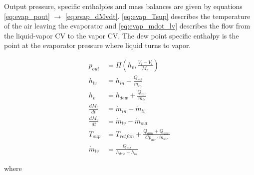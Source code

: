 \medskip
Output pressure, specific enthalpies and mass balances are given by equations \cref{eq:evap_pout} $\rightarrow$ \cref{eq:evap_dMvdt}. \cref{eq:evap_Tsup} describes the temperature of the air leaving the evaporator and \cref{eq:evap_mdot_lv} describes the flow from the liquid-vapor CV to the vapor CV. The dew point specific enthalpy is the point at the evaporator pressure where liquid turns to vapor.

\begin{align}
	p_{out}         & = \Pi \left( h_v, \frac{V_i-V_l}{M_v} \right)		\label{eq:evap_pout}                       \\
	h_{lv}             & = h_{in} + \frac{Q_{ml}}{\dot{m}_{in}}                                                       \\
	h_v             & = h_{dew} + \frac{Q_{mv}}{\dot{m}_{lv}}                                                       \\
	\frac{dM_l}{dt} & = \dot{m}_{in} - \dot{m}_{lv}                                                                \\
	\frac{dM_v}{dt} & = \dot{m}_{lv} - \dot{m}_{out}                   \label{eq:evap_dMvdt}                       \\
	T_{sup}         & = T_{retfan} +  \frac{Q_{aml} + Q_{amv}}{Cp_{air} \cdot \dot{m}_{air}} \label{eq:evap_Tsup} \\
	\dot{m}_{lv}    & = \frac{Q_{ml}}{h_{dew} - h_{in}} \label{eq:evap_mdot_lv}
\end{align}



where\\


